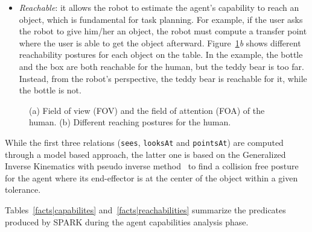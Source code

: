 \documentclass{svmult}
\newcommand{\concept}[1]{{\footnotesize \texttt{#1}}}
\begin{document}
\begin{itemize}
\item \emph{Reachable}: it allows the robot to estimate the agent's capability
to reach an object, which is fundamental for task planning. For example, if the
user asks the robot to give him/her an object, the robot must compute a transfer
point where the user is able to get the object afterward. 
Figure~\ref{fig::sparkRepresentations}\emph{b} shows different reachability postures for each object
on the table. In the example, the bottle and the box are both reachable for the
human, but the teddy bear is too far. Instead, from the robot's perspective,
the teddy bear is reachable for it, while the bottle is not.

\end{itemize}

\begin{figure}[!t]
	\begin{center}
	\caption{(a) Field of view (FOV) and the field of attention (FOA) of the human. (b) Different reaching postures for the human.}
	\label{fig::sparkRepresentations}
	\end{center}
\end{figure} 


While the first three relations (\concept{sees}, \concept{looksAt} and
\concept{pointsAt}) are computed through a model based approach, the latter one
is based on the Generalized Inverse Kinematics with pseudo inverse
method~\cite{Nakamura90,Baerlocher04} to find a collision free posture for the
agent where its end-effector is at the center of the object within a given
tolerance.

Tables~\ref{facts|capabilites} and~\ref{facts|reachabilities} summarize the
predicates produced by SPARK during the agent capabilities analysis phase.
\end{document}
